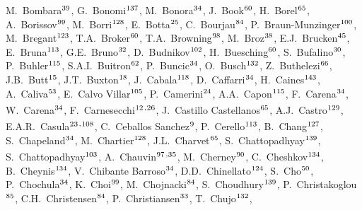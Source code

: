 \begin{flushleft}
M.~Bombara$^\textrm{\scriptsize 39}$,
G.~Bonomi$^\textrm{\scriptsize 137}$,
M.~Bonora$^\textrm{\scriptsize 34}$,
J.~Book$^\textrm{\scriptsize 60}$,
H.~Borel$^\textrm{\scriptsize 65}$,
A.~Borissov$^\textrm{\scriptsize 99}$,
M.~Borri$^\textrm{\scriptsize 128}$,
E.~Botta$^\textrm{\scriptsize 25}$,
C.~Bourjau$^\textrm{\scriptsize 84}$,
P.~Braun-Munzinger$^\textrm{\scriptsize 100}$,
M.~Bregant$^\textrm{\scriptsize 123}$,
T.A.~Broker$^\textrm{\scriptsize 60}$,
T.A.~Browning$^\textrm{\scriptsize 98}$,
M.~Broz$^\textrm{\scriptsize 38}$,
E.J.~Brucken$^\textrm{\scriptsize 45}$,
E.~Bruna$^\textrm{\scriptsize 113}$,
G.E.~Bruno$^\textrm{\scriptsize 32}$,
D.~Budnikov$^\textrm{\scriptsize 102}$,
H.~Buesching$^\textrm{\scriptsize 60}$,
S.~Bufalino$^\textrm{\scriptsize 30}$,
P.~Buhler$^\textrm{\scriptsize 115}$,
S.A.I.~Buitron$^\textrm{\scriptsize 62}$,
P.~Buncic$^\textrm{\scriptsize 34}$,
O.~Busch$^\textrm{\scriptsize 132}$,
Z.~Buthelezi$^\textrm{\scriptsize 66}$,
J.B.~Butt$^\textrm{\scriptsize 15}$,
J.T.~Buxton$^\textrm{\scriptsize 18}$,
J.~Cabala$^\textrm{\scriptsize 118}$,
D.~Caffarri$^\textrm{\scriptsize 34}$,
H.~Caines$^\textrm{\scriptsize 143}$,
A.~Caliva$^\textrm{\scriptsize 53}$,
E.~Calvo Villar$^\textrm{\scriptsize 105}$,
P.~Camerini$^\textrm{\scriptsize 24}$,
A.A.~Capon$^\textrm{\scriptsize 115}$,
F.~Carena$^\textrm{\scriptsize 34}$,
W.~Carena$^\textrm{\scriptsize 34}$,
F.~Carnesecchi$^\textrm{\scriptsize 12}$\textsuperscript{,}$^\textrm{\scriptsize 26}$,
J.~Castillo Castellanos$^\textrm{\scriptsize 65}$,
A.J.~Castro$^\textrm{\scriptsize 129}$,
E.A.R.~Casula$^\textrm{\scriptsize 23}$\textsuperscript{,}$^\textrm{\scriptsize 108}$,
C.~Ceballos Sanchez$^\textrm{\scriptsize 9}$,
P.~Cerello$^\textrm{\scriptsize 113}$,
B.~Chang$^\textrm{\scriptsize 127}$,
S.~Chapeland$^\textrm{\scriptsize 34}$,
M.~Chartier$^\textrm{\scriptsize 128}$,
J.L.~Charvet$^\textrm{\scriptsize 65}$,
S.~Chattopadhyay$^\textrm{\scriptsize 139}$,
S.~Chattopadhyay$^\textrm{\scriptsize 103}$,
A.~Chauvin$^\textrm{\scriptsize 97}$\textsuperscript{,}$^\textrm{\scriptsize 35}$,
M.~Cherney$^\textrm{\scriptsize 90}$,
C.~Cheshkov$^\textrm{\scriptsize 134}$,
B.~Cheynis$^\textrm{\scriptsize 134}$,
V.~Chibante Barroso$^\textrm{\scriptsize 34}$,
D.D.~Chinellato$^\textrm{\scriptsize 124}$,
S.~Cho$^\textrm{\scriptsize 50}$,
P.~Chochula$^\textrm{\scriptsize 34}$,
K.~Choi$^\textrm{\scriptsize 99}$,
M.~Chojnacki$^\textrm{\scriptsize 84}$,
S.~Choudhury$^\textrm{\scriptsize 139}$,
P.~Christakoglou$^\textrm{\scriptsize 85}$,
C.H.~Christensen$^\textrm{\scriptsize 84}$,
P.~Christiansen$^\textrm{\scriptsize 33}$,
T.~Chujo$^\textrm{\scriptsize 132}$,

\end{flushleft}
